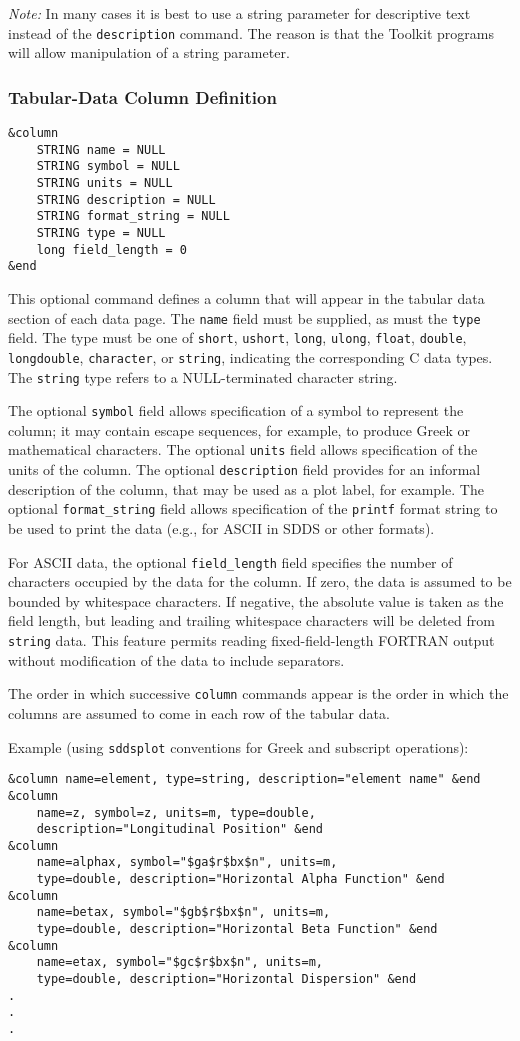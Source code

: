 \documentclass[11pt]{article}
\begin{document}
{\em Note:} In many cases it is best to use a string parameter for descriptive text instead of the {\tt description} command.  The reason is that the Toolkit programs will allow manipulation of a string parameter.

\subsubsection{Tabular-Data Column Definition}
\begin{verbatim}
&column
    STRING name = NULL
    STRING symbol = NULL
    STRING units = NULL
    STRING description = NULL
    STRING format_string = NULL
    STRING type = NULL
    long field_length = 0
&end
\end{verbatim}

This optional command defines a column that will appear in the tabular data section of each data page.  The {\tt name} field must be supplied, as must the {\tt type} field.  The type must be one of {\tt short}, {\tt ushort}, {\tt long}, {\tt ulong}, {\tt float}, {\tt double}, {\tt longdouble}, {\tt character}, or {\tt string}, indicating the corresponding C data types.  The {\tt string} type refers to a NULL-terminated character string.

The optional {\tt symbol} field allows specification of a symbol to represent the column; it may contain escape sequences, for example, to produce Greek or mathematical characters.  The optional {\tt units} field allows specification of the units of the column.  The optional {\tt description} field provides for an informal description of the column, that may be used as a plot label, for example.  The optional {\tt format\_string} field allows specification of the {\tt printf} format string to be used to print the data (e.g., for ASCII in SDDS or other formats).

For ASCII data, the optional {\tt field\_length} field specifies the number of characters occupied by the data for the column.  If zero, the data is assumed to be bounded by whitespace characters.  If negative, the absolute value is taken as the field length, but leading and trailing whitespace characters will be deleted from {\tt string} data.  This feature permits reading fixed-field-length FORTRAN output without modification of the data to include separators.

The order in which successive {\tt column} commands appear is the order in which the columns are assumed to come in each row of the tabular data.

Example (using {\tt sddsplot} conventions for Greek and subscript operations):
\begin{verbatim}
&column name=element, type=string, description="element name" &end
&column 
    name=z, symbol=z, units=m, type=double, 
    description="Longitudinal Position" &end
&column 
    name=alphax, symbol="$ga$r$bx$n", units=m, 
    type=double, description="Horizontal Alpha Function" &end
&column 
    name=betax, symbol="$gb$r$bx$n", units=m, 
    type=double, description="Horizontal Beta Function" &end
&column 
    name=etax, symbol="$gc$r$bx$n", units=m, 
    type=double, description="Horizontal Dispersion" &end
.
.
.
\end{verbatim}
\end{document}
